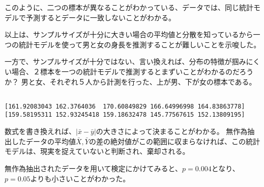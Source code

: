 \fi
{}
このように、二つの標本が異なることがわかっている、データでは、同じ統計モデルで予測するとデータに一致しないことがわかる。
\fi

以上は、サンプルサイズが十分に大きい場合の平均値と分散を知っているから一つの統計モデルを使って男と女の身長を推測することが難しいことを示唆した。


一方で、サンプルサイズが十分ではない、言い換えれば、分布の特徴が掴みにくい場合、２標本を一つの統計モデルで推測するとまずいことがわかるのだろうか？
男と女、それぞれ５人から計測を行った、上が男、下が女の標本である。
\begin{lstlisting}

[161.92083043 162.3764036  170.60849829 166.64996998 164.83863778]
[159.58195311 152.93245418 159.18632478 145.77567615 152.13809195]
\end{lstlisting}



数式を書き換えれば、$|\bar{x}-\bar{y}|$の大きさによって決まることがわかる。
無作為抽出したデータの平均値$\bar{X},\bar{Y}$の差の絶対値がこの範囲に収まらなければ、この統計モデルは、現実を捉えていないと判断され、棄却される。

無作為抽出されたデータを用いて検定にかけてみると、$p=0.004$となり、$p=0.05$よりも小さいことがわかった。

\fi